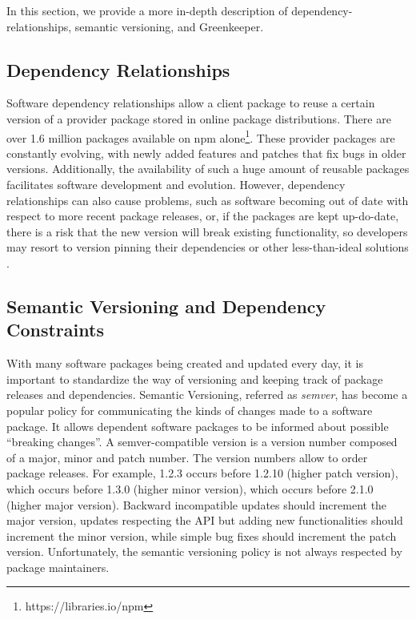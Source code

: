 In this section, we provide a more in-depth description of dependency-relationships, semantic versioning, and Greenkeeper.
~\subsection{Dependency Relationships}
\label{sec:background.dependencies}
Software dependency relationships allow a client package to reuse a certain version of a provider package stored in online package distributions. There are over 1.6 million packages available on npm alone\footnote{https://libraries.io/npm}. These provider packages are constantly evolving, with newly added features and patches that fix bugs in older versions. Additionally, the availability of such a huge amount of reusable packages facilitates software development and evolution. However, dependency relationships can also cause problems, such as software becoming out of date with respect to more recent package releases, or, if the packages are kept up-do-date, there is a risk that the new version will break existing functionality, so developers may resort to version pinning their dependencies or other less-than-ideal solutions \cite{2019CogoDowngrades} \cite{2017_Kula_DoDevsUpdateTheirDependencys}.
~\subsection{Semantic Versioning and Dependency Constraints}
\label{sec:background.semver}
With many software packages being created and updated every day, it is important to standardize the way of versioning and keeping track of package releases and dependencies. Semantic Versioning, referred as \textit{semver}, has become a popular policy for communicating the kinds of changes made to a software package. It allows dependent software packages to be informed about possible “breaking changes”. A semver-compatible version is a version number composed of a major, minor and patch number. The version numbers allow to order package releases. For example, 1.2.3 occurs before 1.2.10 (higher patch version), which occurs before 1.3.0 (higher minor version), which occurs before 2.1.0 (higher major version). Backward incompatible updates should increment the major version, updates respecting the API but adding new functionalities should increment the minor version, while simple bug fixes should increment the patch version. Unfortunately, the semantic versioning policy is not always respected by package maintainers.
